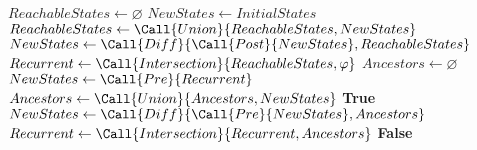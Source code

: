 \documentclass{article}
\begin{document}
\begin{algorithmic}[1]
    \State $ReachableStates \gets \varnothing$
    \State $NewStates \gets InitialStates$
    \State $ReachableStates \gets \Call{Union}{ReachableStates, NewStates}$
    \State $NewStates \gets \Call{Diff}{\Call{Post}{NewStates}, ReachableStates}$
    \EndWhile
    \State $Recurrent \gets \Call{Intersection}{ReachableStates, \varphi}$
    \State $Ancestors \gets \varnothing$
    \State $NewStates \gets \Call{Pre}{Recurrent}$
    \State $Ancestors \gets \Call{Union}{Ancestors, NewStates}$
    \State \Return \textbf{True}
    \EndIf
    \State $NewStates \gets \Call{Diff}{\Call{Pre}{NewStates}, Ancestors}$
    \EndWhile
    \State $Recurrent \gets \Call{Intersection}{Recurrent, Ancestors}$
    \EndWhile
    \Return \textbf{False}
    \EndProcedure
\end{algorithmic}
\end{document}

